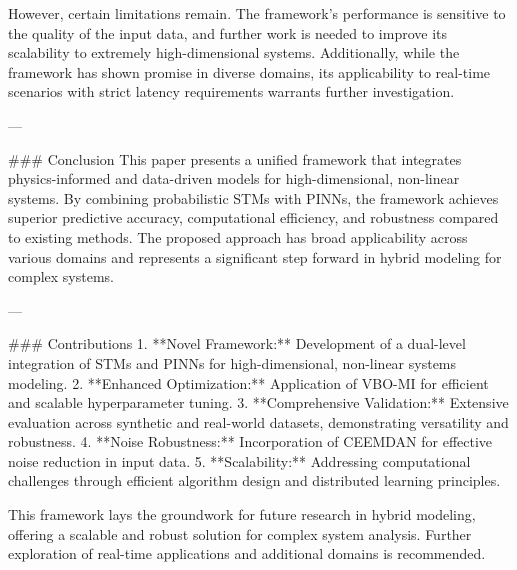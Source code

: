 However, certain limitations remain. The framework's performance is sensitive to the quality of the input data, and further work is needed to improve its scalability to extremely high-dimensional systems. Additionally, while the framework has shown promise in diverse domains, its applicability to real-time scenarios with strict latency requirements warrants further investigation.

---

### Conclusion
This paper presents a unified framework that integrates physics-informed and data-driven models for high-dimensional, non-linear systems. By combining probabilistic STMs with PINNs, the framework achieves superior predictive accuracy, computational efficiency, and robustness compared to existing methods. The proposed approach has broad applicability across various domains and represents a significant step forward in hybrid modeling for complex systems.

---

### Contributions
1. **Novel Framework:** Development of a dual-level integration of STMs and PINNs for high-dimensional, non-linear systems modeling.
2. **Enhanced Optimization:** Application of VBO-MI for efficient and scalable hyperparameter tuning.
3. **Comprehensive Validation:** Extensive evaluation across synthetic and real-world datasets, demonstrating versatility and robustness.
4. **Noise Robustness:** Incorporation of CEEMDAN for effective noise reduction in input data.
5. **Scalability:** Addressing computational challenges through efficient algorithm design and distributed learning principles.

This framework lays the groundwork for future research in hybrid modeling, offering a scalable and robust solution for complex system analysis. Further exploration of real-time applications and additional domains is recommended.